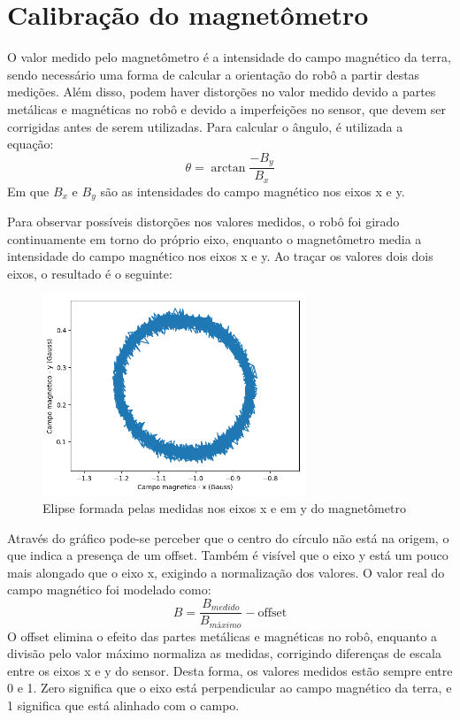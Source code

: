\documentclass[
	12pt,				%
	openright,			%
	twoside,			%
	convert,
	a4paper,			%
	english,			%
	french,				%
	spanish,			%
	brazil				%
	]{abntex2}
\begin{document}
\section{Calibração do magnetômetro}
O valor medido pelo magnetômetro é a intensidade do campo magnético da terra, sendo necessário uma forma de calcular a orientação do robô a partir destas medições. Além disso, podem haver distorções no valor medido devido a partes metálicas e magnéticas no robô e devido a imperfeições no sensor, que devem ser corrigidas antes de serem utilizadas.
Para calcular o ângulo, é utilizada a equação:
\begin{equation}
	\theta = \arctan{\frac{-B_y}{B_x}}
\end{equation}
Em que $B_x$ e $B_y$ são as intensidades do campo magnético nos eixos x e y.
\par
Para observar possíveis distorções nos valores medidos, o robô foi girado continuamente em torno do próprio eixo, enquanto o magnetômetro media a intensidade do campo magnético nos eixos x e y. Ao traçar os valores dois dois eixos, o resultado é o seguinte:
\begin{figure}[H]
	\caption{Elipse formada pelas medidas nos eixos x e em y do magnetômetro}
\begin{center}
   \includegraphics[width=0.7\textwidth]{mag_x_y}
\end{center}
\end{figure}
Através do gráfico pode-se perceber que o centro do círculo não está na origem, o que indica a presença de um offset. Também é visível que o eixo y está um pouco mais alongado que o eixo x, exigindo a normalização dos valores.
O valor real do campo magnético foi modelado como:
\begin{equation}
	B = \frac{B_{medido}}{B_{máximo}} - \mathrm{offset}
\end{equation}
O offset elimina o efeito das partes metálicas e magnéticas no robô, enquanto a divisão pelo valor máximo normaliza as medidas, corrigindo diferenças de escala entre os eixos x e y do sensor. Desta forma, os valores medidos estão sempre entre 0 e 1. Zero significa que o eixo está perpendicular ao campo magnético da terra, e 1 significa que está alinhado com o campo.
\end{document}
